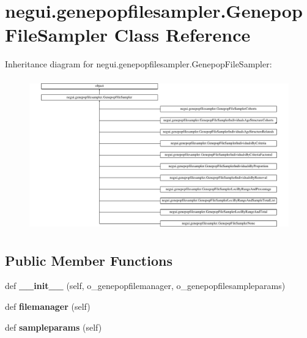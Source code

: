 \hypertarget{classnegui_1_1genepopfilesampler_1_1GenepopFileSampler}{}\section{negui.\+genepopfilesampler.\+Genepop\+File\+Sampler Class Reference}
\label{classnegui_1_1genepopfilesampler_1_1GenepopFileSampler}
Inheritance diagram for negui.\+genepopfilesampler.\+Genepop\+File\+Sampler\+:\begin{figure}[H]
\begin{center}
\leavevmode
\includegraphics[height=6.553191cm]{classnegui_1_1genepopfilesampler_1_1GenepopFileSampler}
\end{center}
\end{figure}
\subsection*{Public Member Functions}
\begin{DoxyCompactItemize}
\item 
def {\bfseries \+\_\+\+\_\+init\+\_\+\+\_\+} (self, o\+\_\+genepopfilemanager, o\+\_\+genepopfilesampleparams)\hypertarget{classnegui_1_1genepopfilesampler_1_1GenepopFileSampler_abcaee019cd11b009568dde7fa2e94341}{}\label{classnegui_1_1genepopfilesampler_1_1GenepopFileSampler_abcaee019cd11b009568dde7fa2e94341}

\item 
def {\bfseries filemanager} (self)\hypertarget{classnegui_1_1genepopfilesampler_1_1GenepopFileSampler_a58431ed64951ef4a3cf813c9ee2624b3}{}\label{classnegui_1_1genepopfilesampler_1_1GenepopFileSampler_a58431ed64951ef4a3cf813c9ee2624b3}

\item 
def {\bfseries sampleparams} (self)\hypertarget{classnegui_1_1genepopfilesampler_1_1GenepopFileSampler_ad48f60ff378a777538a886b058eb0e00}{}\label{classnegui_1_1genepopfilesampler_1_1GenepopFileSampler_ad48f60ff378a777538a886b058eb0e00}

\end{DoxyCompactItemize}


